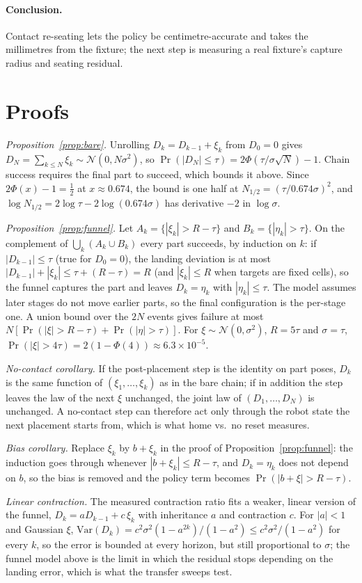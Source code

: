 \documentclass{article}
\begin{document}
\paragraph{Conclusion.} Contact re-seating lets the policy be centimetre-accurate and takes the millimetres from
the fixture; the next step is measuring a real fixture's capture radius and seating residual.



\appendix
\section{Proofs}
\label{app:proofs}
\textit{Proposition~\ref{prop:bare}.} Unrolling $D_k=D_{k-1}+\xi_k$ from $D_0=0$ gives $D_N=\sum_{k\le N}\xi_k\sim
\mathcal{N}(0,N\sigma^2)$, so $\Pr(|D_N|\le\tau)=2\Phi(\tau/\sigma\sqrt N)-1$. Chain success requires the final part to
succeed, which bounds it above. Since $2\Phi(x)-1=\tfrac12$ at $x\approx0.674$, the bound is one half at
$N_{1/2}=(\tau/0.674\sigma)^2$, and $\log N_{1/2}=2\log\tau-2\log(0.674\sigma)$ has derivative $-2$ in $\log\sigma$.

\textit{Proposition~\ref{prop:funnel}.} Let $A_k=\{|\xi_k|>R-\tau\}$ and $B_k=\{|\eta_k|>\tau\}$. On the complement of
$\bigcup_k(A_k\cup B_k)$ every part succeeds, by induction on $k$: if $|D_{k-1}|\le\tau$ (true for $D_0=0$), the
landing deviation is at most $|D_{k-1}|+|\xi_k|\le\tau+(R-\tau)=R$ (and $|\xi_k|\le R$ when targets are fixed cells),
so the funnel captures the part and leaves $D_k=\eta_k$ with $|\eta_k|\le\tau$. The model assumes later stages do
not move earlier parts, so the final configuration is the per-stage one. A union bound over the $2N$ events gives
failure at most $N[\Pr(|\xi|>R-\tau)+\Pr(|\eta|>\tau)]$. For $\xi\sim\mathcal{N}(0,\sigma^2)$, $R=5\tau$ and
$\sigma=\tau$, $\Pr(|\xi|>4\tau)=2(1-\Phi(4))\approx6.3\times10^{-5}$.

\textit{No-contact corollary.} If the post-placement step is the identity on part poses, $D_k$ is the same function of
$(\xi_1,\dots,\xi_k)$ as in the bare chain; if in addition the step leaves the law of the next $\xi$ unchanged, the joint
law of $(D_1,\dots,D_N)$ is unchanged. A no-contact step can therefore act only through the robot state the next
placement starts from, which is what home vs.\ no reset measures.

\textit{Bias corollary.} Replace $\xi_k$ by $b+\xi_k$ in the proof of Proposition~\ref{prop:funnel}: the induction goes
through whenever $|b+\xi_k|\le R-\tau$, and $D_k=\eta_k$ does not depend on $b$, so the bias is removed and the
policy term becomes $\Pr(|b+\xi|>R-\tau)$.

\textit{Linear contraction.} The measured contraction ratio fits a weaker, linear version of the funnel,
$D_k=aD_{k-1}+c\,\xi_k$ with inheritance $a$ and contraction $c$. For $|a|<1$ and Gaussian $\xi$,
$\mathrm{Var}(D_k)=c^2\sigma^2(1-a^{2k})/(1-a^2)\le c^2\sigma^2/(1-a^2)$ for every $k$, so the error is bounded at every
horizon, but still proportional to $\sigma$; the funnel model above is the limit in which the residual stops
depending on the landing error, which is what the transfer sweeps test.
\end{document}
